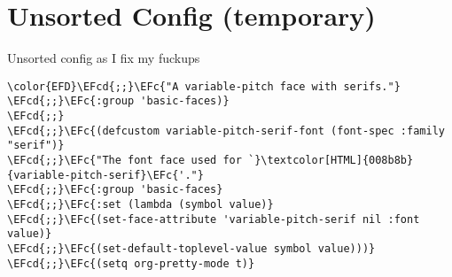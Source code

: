 \documentclass{article}
\newcommand{\EFc}[1]{\textcolor{EFc}{#1}} %
\newcommand{\EFcd}[1]{\textcolor{EFcd}{#1}} %
\begin{document}
\section{Unsorted Config (temporary)}
\label{sec:orge01690d}
Unsorted config as I fix my fuckups
\begin{Code}
\begin{Verbatim}
\color{EFD}\EFcd{;;}\EFc{"A variable-pitch face with serifs."}
\EFcd{;;}\EFc{:group 'basic-faces)}
\EFcd{;;}
\EFcd{;;}\EFc{(defcustom variable-pitch-serif-font (font-spec :family "serif")}
\EFcd{;;}\EFc{"The font face used for `}\textcolor[HTML]{008b8b}{variable-pitch-serif}\EFc{'."}
\EFcd{;;}\EFc{:group 'basic-faces}
\EFcd{;;}\EFc{:set (lambda (symbol value)}
\EFcd{;;}\EFc{(set-face-attribute 'variable-pitch-serif nil :font value)}
\EFcd{;;}\EFc{(set-default-toplevel-value symbol value)))}
\EFcd{;;}\EFc{(setq org-pretty-mode t)}









\end{Verbatim}
\end{Code}
\end{document}
